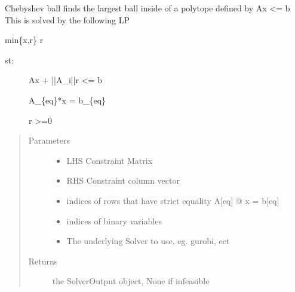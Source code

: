 \documentclass[letterpaper,10pt,english]{sphinxmanual}
\begin{document}
\begin{fulllineitems}
\label{\detokenize{ppopt.utils:ppopt.utils.chebyshev_ball.chebyshev_ball}}
\sphinxAtStartPar
Chebyshev ball finds the largest ball inside of a polytope defined by Ax \textless{}= b
This is solved by the following LP

\sphinxAtStartPar
min\{x,r\} \sphinxhyphen{}r
\begin{description}
\item[{st:}] \leavevmode
\sphinxAtStartPar
Ax + ||A\_i||r \textless{}= b

\sphinxAtStartPar
A\_\{eq\}*x = b\_\{eq\}

\sphinxAtStartPar
r \textgreater{}=0

\end{description}
\begin{quote}\begin{description}
\item[{Parameters}] \leavevmode\begin{itemize}
\item {} 
\sphinxAtStartPar
{} \textendash{} LHS Constraint Matrix

\item {} 
\sphinxAtStartPar
{} \textendash{} RHS Constraint column vector

\item {} 
\sphinxAtStartPar
{} \textendash{} indices of rows that have strict equality A{[}eq{]} @ x = b{[}eq{]}

\item {} 
\sphinxAtStartPar
{} \textendash{} indices of binary variables

\item {} 
\sphinxAtStartPar
{} \textendash{} The underlying Solver to use, eg. gurobi, ect

\end{itemize}

\item[{Returns}] \leavevmode
\sphinxAtStartPar
the SolverOutput object, None if infeasible

\end{description}\end{quote}

\end{fulllineitems}
\end{document}
